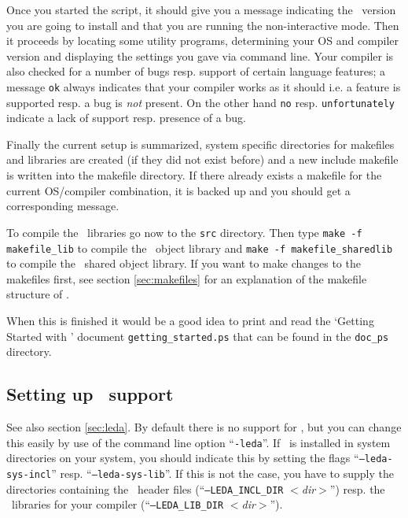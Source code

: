 Once you started the script, it should give you a message indicating
the \cgal\ version you are going to install and that you are running
the non-interactive mode. Then it proceeds by locating some utility
programs, determining your OS and compiler version and displaying the
settings you gave via command line. Your compiler is also checked for
a number of bugs resp. support of certain language features; a message
\texttt{ok} always indicates that your compiler works as it should
i.e. a feature is supported resp. a bug is \textit{not} present. On
the other hand \texttt{no} resp.  \texttt{unfortunately} indicate a
lack of support resp. presence of a bug.

Finally the current setup is summarized, system specific directories
for makefiles and libraries are created (if they did not exist before)
and a new include makefile is written into the makefile directory. If
there already exists a makefile for the current OS/compiler
combination, it is backed up and you should get a corresponding
message.

To compile the \cgal\ libraries go now to the \texttt{src} directory.
Then type \texttt{make -f makefile\_lib} to compile the \cgal\ object
library and \texttt{make -f makefile\_sharedlib} to compile the \cgal\ 
shared object library. If you want to make changes to the makefiles
first, see section \ref{sec:makefiles} for an explanation of the
makefile structure of \cgal.

When this is finished it would be a good idea to print and read the
`Getting Started with \cgal' document \texttt{getting\_started.ps}
that can be found in the \texttt{doc\_ps} directory.

\subsection{Setting up \leda\ support}\label{sec:leda-setup}

See also section \ref{sec:leda}. By default there is no support for
\leda, but you can change this easily by use of the command line
option ``\texttt{-leda}''. If \leda\ is installed in system
directories on your system, you should indicate this by setting the
flags ``{\tt --leda-sys-incl}'' resp.  ``\texttt{--leda-sys-lib}''. If
this is not the case, you have to supply the directories containing
the \leda\ header files (``\texttt{--LEDA\_INCL\_DIR}
\textit{$<$dir$>$}'') resp. the \leda\ libraries for your compiler
(``\texttt{--LEDA\_LIB\_DIR} {\it $<$dir$>$}'').

